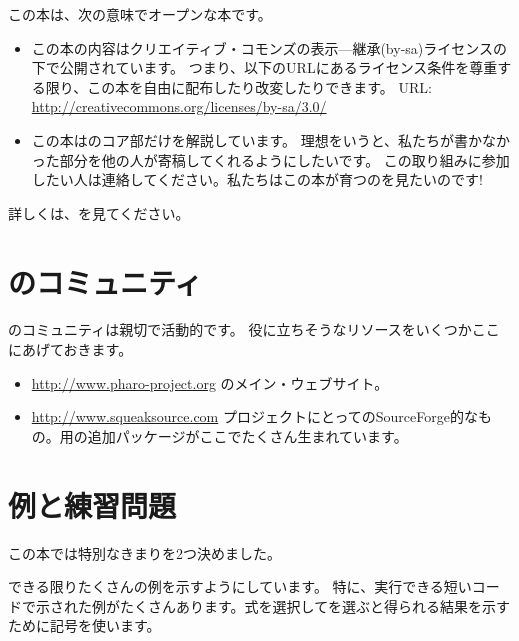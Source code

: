 \documentclass[a4paper,10pt,twoside]{book}
\begin{document}
この本は、次の意味でオープンな本です。

\begin{itemize}


\item	この本の内容はクリエイティブ・コモンズの表示—継承(by-sa)ライセンスの下で公開されています。
		つまり、以下のURLにあるライセンス条件を尊重する限り、この本を自由に配布したり改変したりできます。
		URL: 
		\url{http://creativecommons.org/licenses/by-sa/3.0/}


\item	この本は\pharo のコア部だけを解説しています。
		理想をいうと、私たちが書かなかった部分を他の人が寄稿してくれるようにしたいです。
		この取り組みに参加したい人は連絡してください。私たちはこの本が育つのを見たいのです!
		
\end{itemize}


詳しくは、\pbe を見てください。


\section*{ \pharo のコミュニティ}


\pharo のコミュニティは親切で活動的です。
役に立ちそうなリソースをいくつかここにあげておきます。

\begin{itemize}
\item \url{http://www.pharo-project.org} \pharo のメイン・ウェブサイト。


\item \url{http://www.squeaksource.com} \pharo プロジェクトにとってのSourceForge的なもの。\pharo 用の追加パッケージがここでたくさん生まれています。

\end{itemize}

\section*{例と練習問題}

この本では特別なきまりを2つ決めました。

できる限りたくさんの例を示すようにしています。
特に、実行できる短いコードで示された例がたくさんあります。式を選択してを選ぶと得られる結果を示すために\ct{-->}記号を使います。
\end{document}
